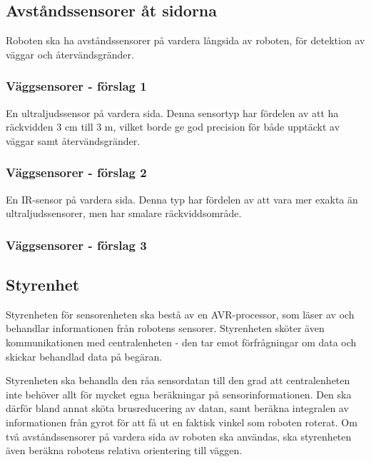 \documentclass[a4paper,titlepage,12pt]{article}
\begin{document}
    \subsection{Avståndssensorer åt sidorna}
    Roboten ska ha avståndssensorer på vardera långsida av roboten, för
    detektion av väggar och återvändsgränder.

    \subsubsection{Väggsensorer - förslag 1}
    
    En ultraljudssensor på vardera sida. Denna sensortyp har fördelen av att ha
    räckvidden 3 cm till 3 m, vilket borde ge god precision för både upptäckt
    av väggar samt återvändsgränder.

    \subsubsection{Väggsensorer - förslag 2}

    En IR-sensor på vardera sida. Denna typ har fördelen av att vara mer exakta
    än ultraljudssensorer, men har smalare räckviddsområde.

    \subsubsection{Väggsensorer - förslag 3}

    

    \subsection{Styrenhet}

    Styrenheten för sensorenheten ska bestå av en AVR-processor, som läser av och behandlar
    informationen från robotens sensorer. Styrenheten sköter även
    kommunikationen med centralenheten - den tar emot förfrågningar om data och
    skickar behandlad data på begäran.

    Styrenheten ska behandla den råa sensordatan till den grad att
    centralenheten inte behöver allt för mycket egna beräkningar på
    sensorinformationen. Den ska därför bland annat sköta brusreducering av
    datan, samt beräkna integralen av informationen från gyrot för att få ut en
    faktisk vinkel som roboten roterat. Om två avståndssensorer på vardera sida
    av roboten ska användas, ska styrenheten även beräkna robotens relativa
    orientering till väggen.
    
\end{document}
